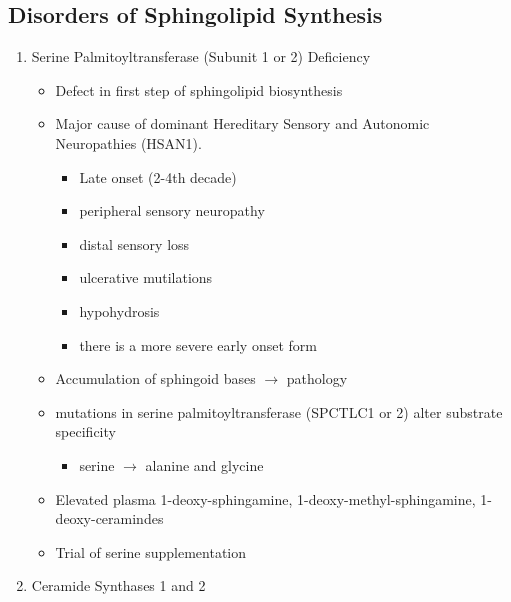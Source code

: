\documentclass{scrartcl}
\begin{document}
\subsection{Disorders of Sphingolipid Synthesis}
\label{sec:orgba146e3}
\begin{enumerate}
\item Serine Palmitoyltransferase (Subunit 1 or 2) Deficiency
\label{sec:org69a47cd}

\begin{itemize}
\item Defect in first step of sphingolipid biosynthesis
\item Major cause of dominant Hereditary Sensory and Autonomic Neuropathies (HSAN1).
\begin{itemize}
\item Late onset (2-4th decade)
\item peripheral sensory neuropathy
\item distal sensory loss
\item ulcerative mutilations
\item hypohydrosis
\item there is a more severe early onset form
\end{itemize}
\item Accumulation of sphingoid bases \(\to\) pathology
\item mutations in serine palmitoyltransferase (SPCTLC1 or 2) alter
substrate specificity
\begin{itemize}
\item serine \(\to\) alanine and glycine
\end{itemize}
\item Elevated plasma 1-deoxy-sphingamine, 1-deoxy-methyl-sphingamine, 1-deoxy-ceramindes
\item Trial of serine supplementation
\end{itemize}

\item Ceramide Synthases 1 and 2
\label{sec:orga74b3dc}


\end{enumerate}
\end{document}
